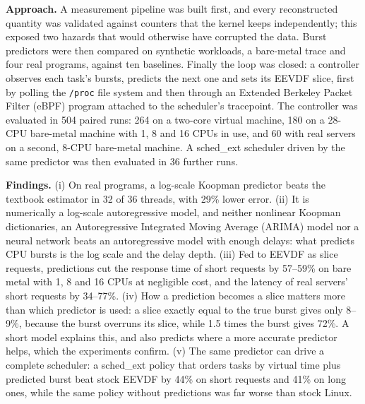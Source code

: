 \documentclass{article}
\begin{document}
\textbf{Approach.} A measurement pipeline was built first, and every reconstructed quantity was validated against counters that the kernel keeps independently; this exposed two hazards that would otherwise have corrupted the data. Burst predictors were then compared on synthetic workloads, a bare-metal trace and four real programs, against ten baselines. Finally the loop was closed: a controller observes each task's bursts, predicts the next one and sets its EEVDF slice, first by polling the \texttt{/proc} file system and then through an Extended Berkeley Packet Filter (eBPF) program attached to the scheduler's tracepoint. The controller was evaluated in 504 paired runs: 264 on a two-core virtual machine, 180 on a 28-CPU bare-metal machine with 1, 8 and 16 CPUs in use, and 60 with real servers on a second, 8-CPU bare-metal machine. A sched\_ext scheduler driven by the same predictor was then evaluated in 36 further runs.

\textbf{Findings.} (i) On real programs, a log-scale Koopman predictor beats the textbook estimator in 32 of 36 threads, with 29\% lower error. (ii) It is numerically a log-scale autoregressive model, and neither nonlinear Koopman dictionaries, an Autoregressive Integrated Moving Average (ARIMA) model nor a neural network beats an autoregressive model with enough delays: what predicts CPU bursts is the log scale and the delay depth. (iii) Fed to EEVDF as slice requests, predictions cut the response time of short requests by 57--59\% on bare metal with 1, 8 and 16 CPUs at negligible cost, and the latency of real servers' short requests by 34--77\%. (iv) How a prediction becomes a slice matters more than which predictor is used: a slice exactly equal to the true burst gives only 8--9\%, because the burst overruns its slice, while 1.5 times the burst gives 72\%. A short model explains this, and also predicts where a more accurate predictor helps, which the experiments confirm. (v) The same predictor can drive a complete scheduler: a sched\_ext policy that orders tasks by virtual time plus predicted burst beat stock EEVDF by 44\% on short requests and 41\% on long ones, while the same policy without predictions was far worse than stock Linux.
\end{document}
